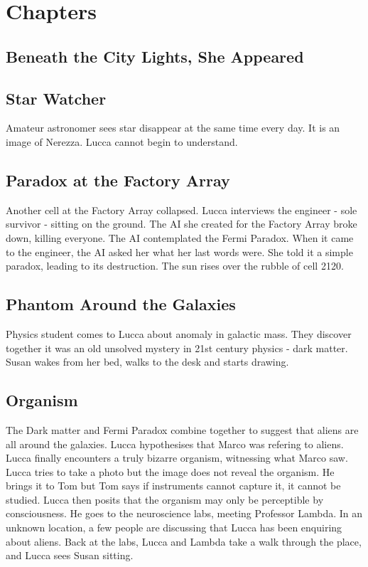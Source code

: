 \documentclass[11pt]{article}
\begin{document}
\newpage
\section{Chapters}
	\subsection{Beneath the City Lights, She Appeared}
	
	\subsection{Star Watcher}
	Amateur astronomer sees star disappear at the same time every day. It is an image of Nerezza. Lucca cannot begin to understand.
	\subsection{Paradox at the Factory Array}
	Another cell at the Factory Array collapsed. Lucca interviews the engineer - sole survivor - sitting on the ground. The AI she created for the Factory Array broke down, killing everyone. The AI contemplated the Fermi Paradox. When it came to the engineer, the AI asked her what her last words were. She told it a simple paradox, leading to its destruction. The sun rises over the rubble of cell 2120.
	\subsection{Phantom Around the Galaxies}
	Physics student comes to Lucca about anomaly in galactic mass. They discover together it was an old unsolved mystery in 21st century physics - dark matter. Susan wakes from her bed, walks to the desk and starts drawing. 
	\subsection{Organism}
	The Dark matter and Fermi Paradox combine together to suggest that aliens are all around the galaxies. Lucca hypothesises that Marco was refering to aliens. Lucca finally encounters a truly bizarre organism, witnessing what Marco saw. Lucca tries to take a photo but the image does not reveal the organism. He brings it to Tom but Tom says if instruments cannot capture it, it cannot be studied. Lucca then posits that the organism may only be perceptible by consciousness. He goes to the neuroscience labs, meeting Professor Lambda. In an unknown location, a few people are discussing that Lucca has been enquiring about aliens. Back at the labs, Lucca and Lambda take a walk through the place, and Lucca sees Susan sitting. 
\end{document}
